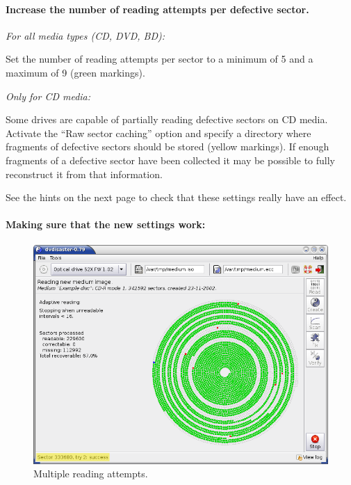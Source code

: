 \paragraph{Increase the number of reading attempts per defective sector.}\quad

\bigskip

{\em For all media types (CD, DVD, BD):}

\medskip

Set the number of reading attempts per sector to a minimum of 5 and
a maximum of 9 (green markings).

\bigskip

{\em Only for CD media:}

\medskip

Some drives are capable of partially reading defective sectors on
CD media. Activate the ``Raw sector caching'' option and specify
a directory where fragments of defective sectors should be stored
(yellow markings). If enough fragments of a defective sector have
been collected it may be possible to fully reconstruct it from
that information. 

\medskip

See the hints on the next page to check that these settings
really have an effect.

\paragraph{Making sure that the new settings work:}\quad

\begin{figure}[h]
\centerline{\includegraphics[width=\textwidth]{screenshots/fix-reread-dvd.png}}
\caption{Multiple reading attempts.}
\label{howto-recover-multiple-read-attempts}
\end{figure}

